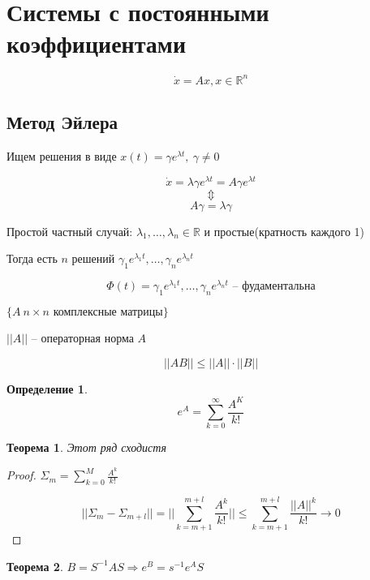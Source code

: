 \documentclass[a4paper]{article}
\theoremstyle{indented}
\newtheorem*{theorem}{Теорема}
\theoremstyle{definition}
\newtheorem*{defn}{Определение}
\theoremstyle{remark}
\begin{document}
\section{Системы с постоянными коэффициентами}

\[\dot x = Ax, x \in \mathbb{R}^n\]

\subsection{Метод Эйлера}

Ищем решения в виде $x(t) = \gamma e^{\lambda t},\  \gamma \neq 0$

\[\dot x = \lambda \gamma e^{\lambda t} = A \gamma e^{\lambda t} \]
\[\Updownarrow\]
\[A \gamma = \lambda \gamma\]


Простой частный случай: $\lambda_1, \ldots, \lambda_n \in \mathbb{R} $ и простые(кратность каждого 1)

Тогда есть $n$ решений $\gamma_1 e^{\lambda_1 t}, \ldots, \gamma_n e^{\lambda_n t}$

\[\Phi(t) = \gamma_1 e^{\lambda_1 t}, \ldots, \gamma_n e^{\lambda_n t} \text{ -- фудаментальна}\]




$\{ A \ n\times n \text{ комплексные матрицы}\}$

$||A||$ -- операторная норма $A$

\[||AB|| \leqslant ||A|| \cdot ||B||\]

\begin{defn}
  \[e^A = \sum_{k = 0}^{\infty} \frac{A^K}{k!}\]
\end{defn}

\begin{theorem}
  Этот ряд сходистя
\end{theorem}
\begin{proof}
  $\Sigma_m = \sum_{k = 0}^{M}\frac{A^k}{k!}$

  \[||\Sigma_m - \Sigma_{m+l}|| = || \sum_{k= m+1}^{m+l}\frac{A^k}{k!} ||\leqslant \sum_{k = m+1}^{m+l}\frac{||A||^k}{k!} \to 0\]
  
\end{proof}

\begin{theorem}
  $B = S^{-1} AS \Rightarrow e^B = s^{-1} e^A S$
\end{theorem}
\end{document}
